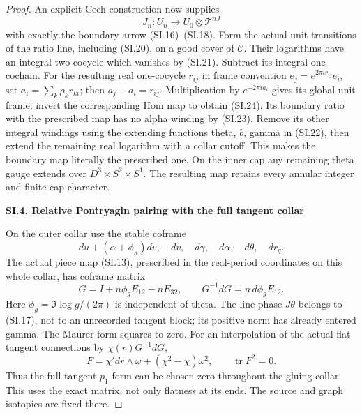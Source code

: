 \begin{proof}
An explicit Cech construction now supplies
\[
 J_n:U_n\longrightarrow U_0\otimes\mathcal T^{nJ}
                                                        \tag{SI.24}
\]
with exactly the boundary arrow (SI.16)--(SI.18). Form the actual
unit transitions of the ratio line, including (SI.20), on a good
cover of \(\mathcal C\). Their logarithms have an integral two-cocycle
which vanishes by (SI.21). Subtract its integral one-cochain. For
the resulting real one-cocycle \(r_{ij}\) in frame convention
\(e_j=e^{2\pi i r_{ij}}e_i\), set \(a_i=\sum_k\rho_k r_{ki}\); then
\(a_j-a_i=r_{ij}\). Multiplication by \(e^{-2\pi i a_i}\) gives its
global unit frame; invert the corresponding Hom map to obtain
(SI.24). Its boundary ratio with the prescribed map has no alpha
winding by (SI.23). Remove its other integral windings using the
extending functions theta, \(b\), gamma in (SI.22), then extend the
remaining real logarithm with a collar cutoff. This makes the
boundary map literally the prescribed one. On the inner cap any
remaining theta gauge extends over \(D^3\times S^2\times S^1\).
The resulting map retains every annular integer and finite-cap
character.

\par

\medskip\noindent\textbf{SI.4. Relative Pontryagin pairing with the full tangent collar}

\par\nobreak

On the outer collar use the stable coframe
\[
 du+(\alpha+\phi_\kappa)dv,\quad dv,\quad d\gamma,
 \quad d\alpha,\quad d\theta,\quad dr_q.
\]
The actual piece map (SI.13), prescribed in the real-period coordinates
on this whole collar, has coframe matrix
\[
 G=I+n\phi_g E_{12}-nE_{32},\qquad
 G^{-1}dG=n\,d\phi_g E_{12}.                         \tag{SI.25}
\]
Here \(\phi_g=\Im\log g/(2\pi)\) is independent of theta. The line
phase \(J\theta\) belongs to (SI.17), not to an unrecorded tangent
block; its positive norm has already entered gamma. The Maurer
form squares to zero. For an interpolation of the actual flat
tangent connections by \(\chi(r)G^{-1}dG\),
\[
 F=\chi' dr\wedge\omega+(\chi^2-\chi)\omega^2,
 \qquad\operatorname{tr}F^2=0.                       \tag{SI.26}
\]
Thus the full tangent \(p_1\) form can be chosen zero throughout
the gluing collar. This uses the exact matrix, not only flatness
at its ends. The source and graph isotopies are fixed there.


\end{proof}

